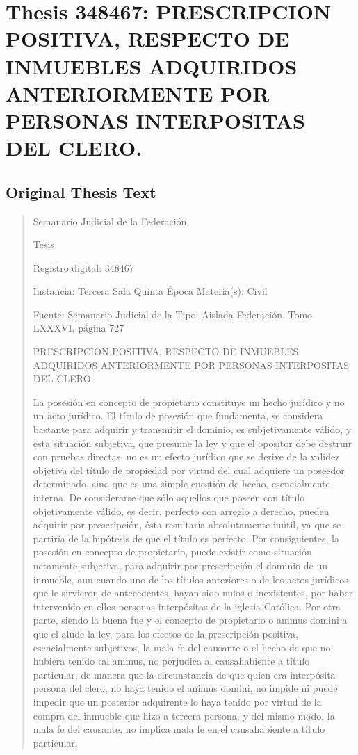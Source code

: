 \documentclass[11pt,a4paper]{article}
\begin{document}
\newpage

\section{Thesis 348467: PRESCRIPCION POSITIVA, RESPECTO DE INMUEBLES ADQUIRIDOS ANTERIORMENTE POR PERSONAS INTERPOSITAS DEL CLERO.}
\label{thesis:348467}

\subsection{Original Thesis Text}

\begin{quote}
                                                   Semanario Judicial de la Federación

                                                  Tesis

 Registro digital: 348467

 Instancia: Tercera Sala           Quinta Época                          Materia(s): Civil

                                   Fuente: Semanario Judicial de la      Tipo: Aislada
                                   Federación.
                                   Tomo LXXXVI, página 727


PRESCRIPCION POSITIVA, RESPECTO DE INMUEBLES ADQUIRIDOS ANTERIORMENTE POR
PERSONAS INTERPOSITAS DEL CLERO.


La posesión en concepto de propietario constituye un hecho jurídico y no un acto jurídico. El título
de posesión que fundamenta, se considera bastante para adquirir y transmitir el dominio, es
subjetivamente válido, y esta situación subjetiva, que presume la ley y que el opositor debe destruir
con pruebas directas, no es un efecto jurídico que se derive de la validez objetiva del título de
propiedad por virtud del cual adquiere un poseedor determinado, sino que es una simple cuestión
de hecho, esencialmente interna. De considerarse que sólo aquellos que poseen con título
objetivamente válido, es decir, perfecto con arreglo a derecho, pueden adquirir por prescripción,
ésta resultaría absolutamente inútil, ya que se partiría de la hipótesis de que el título es perfecto.
Por consiguientes, la posesión en concepto de propietario, puede existir como situación netamente
subjetiva, para adquirir por prescripción el dominio de un inmueble, aun cuando uno de los títulos
anteriores o de los actos jurídicos que le sirvieron de antecedentes, hayan sido nulos o inexistentes,
por haber intervenido en ellos personas interpósitas de la iglesia Católica. Por otra parte, siendo la
buena fue y el concepto de propietario o animus domini a que el alude la ley, para los efectos de la
prescripción positiva, esencialmente subjetivos, la mala fe del causante o el hecho de que no
hubiera tenido tal animus, no perjudica al causahabiente a título particular; de manera que la
circunstancia de que quien era interpósita persona del clero, no haya tenido el animus domini, no
impide ni puede impedir que un posterior adquirente lo haya tenido por virtud de la compra del
inmueble que hizo a tercera persona, y del mismo modo, la mala fe del causante, no implica mala fe
en el causahabiente a título particular.



\end{quote}
\end{document}
